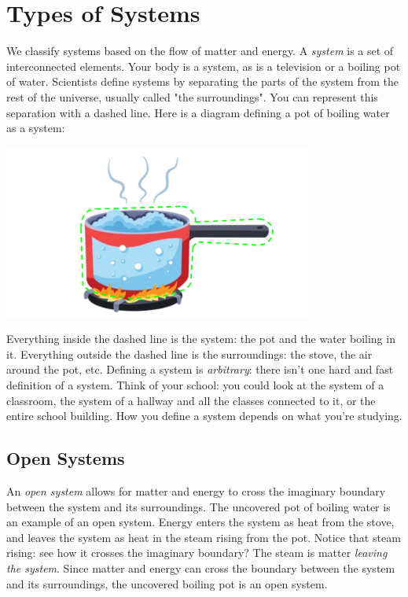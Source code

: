 \section{Types of Systems}
We classify systems based on the flow of matter and energy. A \textit{system} is 
a set of interconnected elements. Your body is a system, as is a television or a 
boiling pot of water. Scientists define systems by separating the parts of the 
system from the rest of the universe, usually called "the surroundings". You can 
represent this separation with a dashed line. Here is a diagram defining a pot of
boiling water as a system:

\begin{center}
\includegraphics[width=4in]{pot_open_system.png}
\end{center}

Everything inside the dashed line is the system: the pot and the water boiling in
it. Everything outside the dashed line is the surroundings: the stove, the air 
around the pot, etc. Defining a system is \textit{arbitrary}: there isn't one hard 
and fast definition of a system. Think of your school: you could look at the 
system of a classroom, the system of a hallway and all the classes connected to 
it, or the entire school building. How you define a system depends on what you're 
studying. 

\subsection{Open Systems}
An \textit{open system} allows for matter and energy to cross the imaginary 
boundary between the system and its surroundings. The uncovered pot of boiling 
water is an example of an open system. Energy enters the system as heat from the
stove, and leaves the system as heat in the steam rising from the pot. Notice 
that steam rising: see how it crosses the imaginary boundary? The steam is matter 
\textit{leaving the system}. Since matter and energy can cross the boundary 
between the system and its surroundings, the uncovered boiling pot is an open 
system. 

